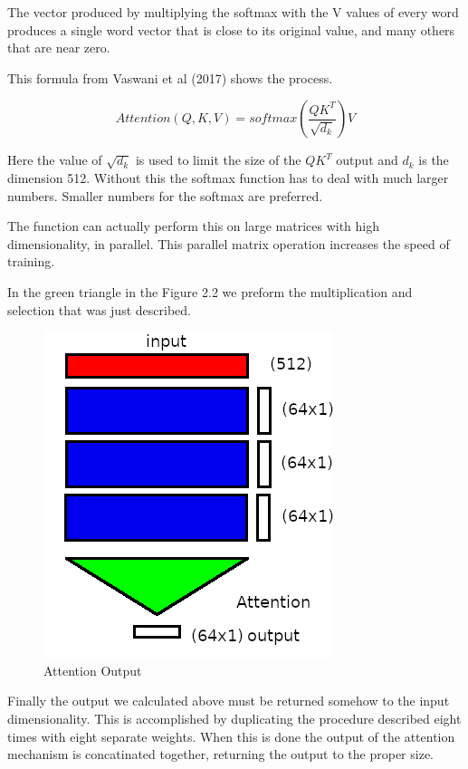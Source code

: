 The vector produced by multiplying the softmax with the V values of every word produces a single word vector that is close to its original value, and many others that are near zero.

This formula from Vaswani et al (2017)\cite{Vaswani2017AttentionIA} 
shows the process.

$$
Attention(Q,K,V)=softmax(\dfrac{QK^T}{\sqrt{d_k}})V
$$

Here the value of $\sqrt{d_k}$ is used to limit the size of the $QK^T$ output and $d_k$ is the dimension 512. Without this the softmax function has to deal with much larger numbers. Smaller numbers for the softmax are preferred. 

The function can actually perform this on large matrices with high dimensionality, in parallel. This parallel matrix operation increases the speed of training.

In the green triangle in the Figure 2.2 we preform the multiplication and selection that was just described.

\begin{figure}[H]
	\begin{center}
		
		
		\includegraphics[scale=0.5]{diagram-mat03-64}
	\end{center}
	\caption[Attention Output]{Attention Output}
	
\end{figure}




Finally the output we calculated above must be returned somehow to the input dimensionality. This is accomplished by duplicating the procedure described eight times with eight separate weights. When this is done the output of the attention mechanism is concatinated together, returning the output to the proper size.

